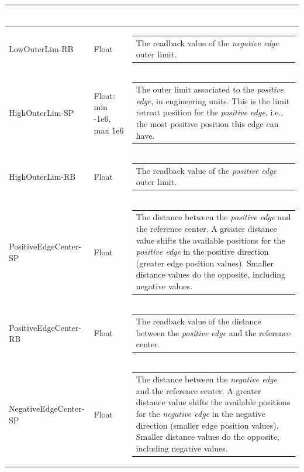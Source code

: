 \documentclass[openany]{article}
\begin{document}
\begin{longtable}{| m{4.5cm} m{2.5cm}  m{7.0cm} |}
\begin{tabular}{@{}m{6cm}@{}}
            \end{tabular} \hypertarget{}{}\\ \hline
        LowOuterLim-RB & Float & \begin{tabular}{@{}m{6cm}@{}}
                The readback value of the \emph{negative edge} outer limit.
            \end{tabular} \hypertarget{pv:high-outer-lim}{}\\ \hline
        HighOuterLim-SP & Float: min -1e6, max 1e6 & \begin{tabular}{@{}m{6cm}@{}}
                The outer limit associated to the \emph{positive edge}, in engineering units. This is the limit retreat position for the \emph{positive edge}, i.e., the most positive position this edge can have.
            \end{tabular} \hypertarget{}{}\\ \hline
        HighOuterLim-RB & Float & \begin{tabular}{@{}m{6cm}@{}}
                The readback value of the \emph{positive edge} outer limit.
            \end{tabular} \hypertarget{pv:positive-edge-center}{}\\ \hline
        PositiveEdgeCenter-SP & Float & \begin{tabular}{@{}m{6cm}@{}}
                The distance between the \emph{positive edge} and the reference center. A greater distance value shifts the available positions for the \emph{positive edge} in the positive direction (greater edge position values). Smaller distance values do the opposite, including negative values.
            \end{tabular} \hypertarget{}{}\\ \hline
        PositiveEdgeCenter-RB & Float & \begin{tabular}{@{}m{6cm}@{}}
                The readback value of the distance between the \emph{positive edge} and the reference center.
            \end{tabular} \hypertarget{pv:negative-edge-center}{}\\ \hline
        NegativeEdgeCenter-SP & Float & \begin{tabular}{@{}m{6cm}@{}}
                The distance between the \emph{negative edge} and the reference center. A greater distance value shifts the available positions for the \emph{negative edge} in the negative direction (smaller edge position values). Smaller distance values do the opposite, including negative values.

\end{tabular}
\end{longtable}
\end{document}
